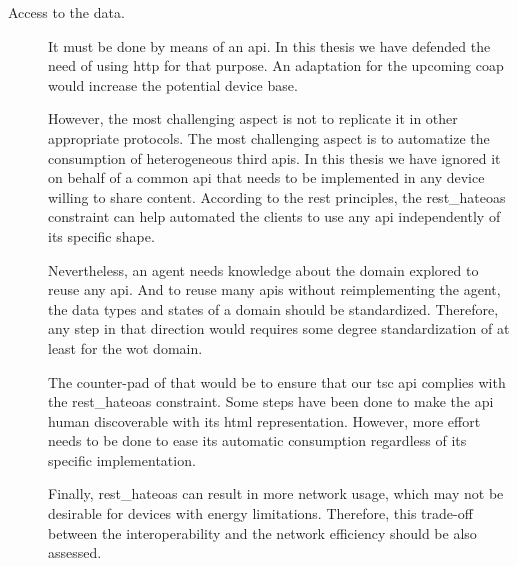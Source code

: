 \begin{description}
  \item[Access to the data.] It must be done by means of an \ac{api}.
			    In this thesis we have defended the need of using \ac{http} for that purpose.
			    An adaptation for the upcoming \ac{coap} would increase the potential device base. %
			    
			    However, the most challenging aspect is not to replicate it in other appropriate protocols.
			    The most challenging aspect is to automatize the consumption of heterogeneous third \acp{api}.
			    In this thesis we have ignored it on behalf of a common \ac{api} that needs to be implemented in any device willing to share content. %
			    According to the \ac{rest} principles, the \ac{rest_hateoas} constraint can help automated the clients to use any \ac{api} independently of its specific shape. %
			    
			    Nevertheless, an agent needs knowledge about the domain explored to reuse any \ac{api}.
			    And to reuse many \acp{api} without reimplementing the agent, the data types and states of a domain should be standardized. %
			    Therefore, any step in that direction would requires some degree standardization of at least for the \ac{wot} domain.
			    
			    The counter-pad of that would be to ensure that our \ac{tsc} \ac{api} complies with the \ac{rest_hateoas} constraint.
			    Some steps have been done to make the \ac{api} human discoverable with its \ac{html} representation.
			    However, more effort needs to be done to ease its automatic consumption regardless of its specific implementation. %
			    
			    Finally, \ac{rest_hateoas} can result in more network usage, which may not be desirable for devices with energy limitations.
			    Therefore, this trade-off between the interoperability and the network efficiency should be also assessed.
			    

\end{description}
